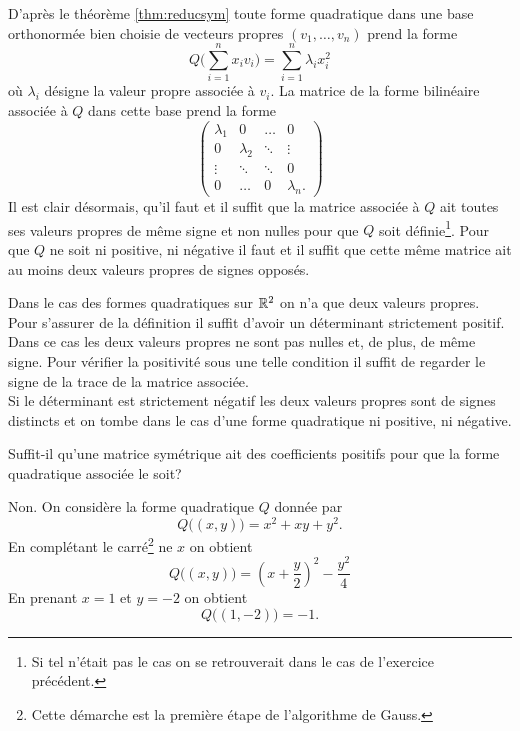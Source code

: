 \documentclass[11pt, a4paper]{article}
\begin{document}
\begin{solution}
  D'après le théorème \eqref{thm:reducsym} toute forme quadratique
  dans une base orthonormée bien choisie de vecteurs propres
  $(v_1, \ldots, v_n)$ prend la forme
  \[
  Q\Big(\sum_{i=1}^n x_i v_i\Big) = \sum_{i=1}^n \lambda_i x_i^2
  \]
  où $\lambda_i$ désigne la valeur propre associée à $v_i$. La matrice
  de la forme bilinéaire associée à $Q$ dans cette base prend la forme
  \[
  \begin{pmatrix}
    \lambda_1 & 0 & \hdots & 0 \\
    0 & \lambda_2 & \ddots & \vdots \\
    \vdots & \ddots & \ddots & 0 \\
    0 & \hdots & 0 & \lambda_n.
  \end{pmatrix}
  \]
  Il est clair désormais, qu'il faut et il suffit que la matrice
  associée à $Q$ ait toutes ses valeurs propres de même signe et non
  nulles pour que $Q$ soit définie\footnote{Si tel n'était pas le cas
    on se retrouverait dans le cas de l'exercice précédent.}. Pour que
  $Q$ ne soit ni positive, ni négative il faut et il suffit que cette
  même matrice ait au moins deux valeurs propres de signes opposés.

  Dans le cas des formes quadratiques sur $\mathbb{R}^2$ on n'a que deux
  valeurs propres. Pour s'assurer de la définition il suffit d'avoir
  un déterminant strictement positif. Dans ce cas les deux valeurs
  propres ne sont pas nulles et, de plus, de même signe. Pour vérifier
  la positivité sous une telle condition il suffit de regarder le
  signe de la trace de la matrice associée. \\
  Si le déterminant est strictement négatif les deux valeurs propres
  sont de signes distincts et on tombe dans le cas d'une forme
  quadratique ni positive, ni négative.
\end{solution}

\begin{question}
  Suffit-il qu'une matrice symétrique ait des coefficients positifs
  pour que la forme quadratique associée le soit?
\end{question}

\begin{solution}
  Non. On considère la forme quadratique $Q$ donnée par
  \[
  Q\big((x,y)\big) = x^2 + xy + y^2.
  \]
  En complétant le carré\footnote{Cette démarche est la première étape
    de l'algorithme de Gauss.} ne $x$ on obtient
  \[
  Q\big((x, y)\big) = \left(x + \frac{y}{2}\right)^2 - \frac{y^2}{4}
  \]
  En prenant $x = 1$ et $y = -2$ on obtient
  \[
  Q\big((1, -2)\big) = -1.
  \]
\end{solution}
\end{document}
